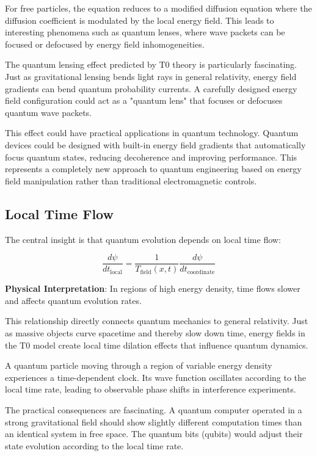 \documentclass[12pt,a4paper]{article}
\theoremstyle{definition}
\theoremstyle{remark}
\begin{document}
For free particles, the equation reduces to a modified diffusion equation where the diffusion coefficient is modulated by the local energy field. This leads to interesting phenomena such as quantum lenses, where wave packets can be focused or defocused by energy field inhomogeneities.

The quantum lensing effect predicted by T0 theory is particularly fascinating. Just as gravitational lensing bends light rays in general relativity, energy field gradients can bend quantum probability currents. A carefully designed energy field configuration could act as a "quantum lens" that focuses or defocuses quantum wave packets.

This effect could have practical applications in quantum technology. Quantum devices could be designed with built-in energy field gradients that automatically focus quantum states, reducing decoherence and improving performance. This represents a completely new approach to quantum engineering based on energy field manipulation rather than traditional electromagnetic controls.

\subsection{Local Time Flow}

The central insight is that quantum evolution depends on local time flow:

\begin{equation}
	\frac{d\psi}{dt_{\text{local}}} = \frac{1}{T_{\text{field}}(x,t)} \frac{d\psi}{dt_{\text{coordinate}}}
	\label{eq:local_time_flow}
\end{equation}

\textbf{Physical Interpretation}: In regions of high energy density, time flows slower and affects quantum evolution rates.

This relationship directly connects quantum mechanics to general relativity. Just as massive objects curve spacetime and thereby slow down time, energy fields in the T0 model create local time dilation effects that influence quantum dynamics.

A quantum particle moving through a region of variable energy density experiences a time-dependent clock. Its wave function oscillates according to the local time rate, leading to observable phase shifts in interference experiments.

The practical consequences are fascinating. A quantum computer operated in a strong gravitational field should show slightly different computation times than an identical system in free space. The quantum bits (qubits) would adjust their state evolution according to the local time rate.
\end{document}

